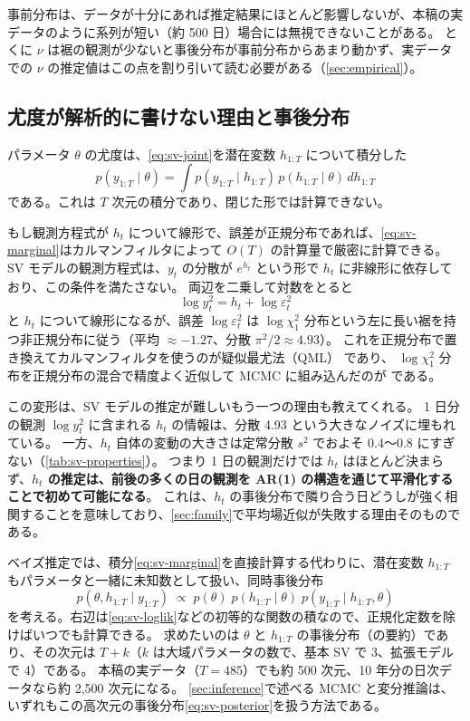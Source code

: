 事前分布は、データが十分にあれば推定結果にほとんど影響しないが、本稿の実データのように系列が短い（約 500 日）場合には無視できないことがある。
とくに $\nu$ は裾の観測が少ないと事後分布が事前分布からあまり動かず、実データでの $\nu$ の推定値はこの点を割り引いて読む必要がある（\cref{sec:empirical}）。

\subsection{尤度が解析的に書けない理由と事後分布}\label{sec:model-likelihood}

パラメータ $\theta$ の尤度は、\cref{eq:sv-joint}を潜在変数 $h_{1:T}$ について積分した
\begin{equation}
  p(y_{1:T} \mid \theta) = \int p(y_{1:T} \mid h_{1:T})\, p(h_{1:T} \mid \theta)\, dh_{1:T}
  \label{eq:sv-marginal}
\end{equation}
である。これは $T$ 次元の積分であり、閉じた形では計算できない。

もし観測方程式が $h_t$ について線形で、誤差が正規分布であれば、\cref{eq:sv-marginal}はカルマンフィルタによって $O(T)$ の計算量で厳密に計算できる。
SV モデルの観測方程式は、$y_t$ の分散が $e^{h_t}$ という形で $h_t$ に非線形に依存しており、この条件を満たさない。
両辺を二乗して対数をとると
\[
  \log y_t^2 = h_t + \log \varepsilon_t^2
\]
と $h_t$ について線形になるが、誤差 $\log \varepsilon_t^2$ は $\log \chi^2_1$ 分布という左に長い裾を持つ非正規分布に従う（平均 $\approx -1.27$、分散 $\pi^2/2 \approx 4.93$）。
これを正規分布で置き換えてカルマンフィルタを使うのが疑似最尤法（QML）\parencite{harvey1994} であり、
$\log \chi^2_1$ 分布を正規分布の混合で精度よく近似して MCMC に組み込んだのが \textcite{kim1998} である。

この変形は、SV モデルの推定が難しいもう一つの理由も教えてくれる。
1 日分の観測 $\log y_t^2$ に含まれる $h_t$ の情報は、分散 4.93 という大きなノイズに埋もれている。
一方、$h_t$ 自体の変動の大きさは定常分散 $s^2$ でおよそ 0.4〜0.8 にすぎない（\cref{tab:sv-properties}）。
つまり 1 日の観測だけでは $h_t$ はほとんど決まらず、\textbf{$h_t$ の推定は、前後の多くの日の観測を AR(1) の構造を通じて平滑化することで初めて可能になる}。
これは、$h_t$ の事後分布で隣り合う日どうしが強く相関することを意味しており、\cref{sec:family}で平均場近似が失敗する理由そのものである。

ベイズ推定では、積分\cref{eq:sv-marginal}を直接計算する代わりに、潜在変数 $h_{1:T}$ もパラメータと一緒に未知数として扱い、同時事後分布
\begin{equation}
  p(\theta, h_{1:T} \mid y_{1:T}) \;\propto\; p(\theta)\; p(h_{1:T} \mid \theta)\; p(y_{1:T} \mid h_{1:T}, \theta)
  \label{eq:sv-posterior}
\end{equation}
を考える。右辺は\cref{eq:sv-loglik}などの初等的な関数の積なので、正規化定数を除けばいつでも計算できる。
求めたいのは $\theta$ と $h_{1:T}$ の事後分布（の要約）であり、その次元は $T + k$（$k$ は大域パラメータの数で、基本 SV で 3、拡張モデルで 4）である。
本稿の実データ（$T = 485$）でも約 500 次元、10 年分の日次データなら約 2,500 次元になる。
\cref{sec:inference}で述べる MCMC と変分推論は、いずれもこの高次元の事後分布\cref{eq:sv-posterior}を扱う方法である。

